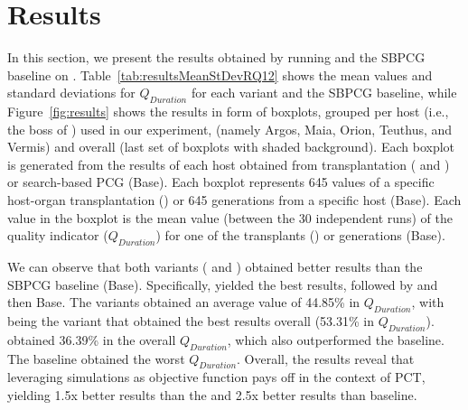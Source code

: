 \section{Results}
\label{sec:Results}

In this section, we present the results obtained by running \ApproachName{} and the SBPCG baseline on \CaseStudy{}.
Table~\ref{tab:resultsMeanStDevRQ12} shows the mean values and standard deviations for $Q_{Duration}$ for each \ApproachName{} variant and the SBPCG baseline, while Figure~\ref{fig:results} shows the results in form of boxplots, grouped per host (i.e., the boss of \CaseStudy{}) used in our experiment, (namely Argos, Maia, Orion, Teuthus, and Vermis) and overall (last set of boxplots with shaded background).  
Each boxplot is generated from the results of each host obtained from transplantation \ApproachName{} (\simhotep{} and \timhotep{}) or search-based PCG (Base). Each boxplot represents 645 values of a specific host-organ transplantation (\ApproachName{}) or 645 generations from a specific host (Base). Each value in the boxplot is the mean value (between the 30 independent runs) of the quality indicator ($Q_{Duration}$) for one of the transplants (\ApproachName{}) or generations (Base). 

We can observe that both variants (\simhotep{} and \timhotep{}) obtained better results than the SBPCG baseline (Base). Specifically, \simhotep{} yielded the best results, followed by \timhotep{} and then Base. The variants obtained an average value of 44.85\% in $Q_{Duration}$, with \simhotep{} being the variant that obtained the best results overall (53.31\% in $Q_{Duration}$). \timhotep obtained 36.39\% in the overall $Q_{Duration}$, which also outperformed the baseline. The baseline obtained the worst $Q_{Duration}$. Overall, the results reveal that leveraging simulations as objective function pays off in the context of PCT, yielding 1.5x better results than the \timhotep{} and 2.5x better results than baseline.


